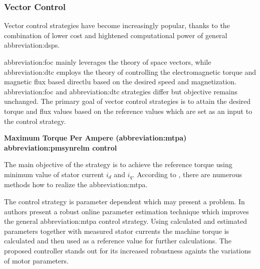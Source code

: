 \documentclass[a4paper, twoside, 11pt]{article}
\begin{document}
        \subsubsection{Vector Control}
            Vector control strategies have become increasingly popular, thanks to the combination of lower cost and hightened computational power of general \gls{abbreviation:dsp}s. \cite{dwivedi-review-on-control-strategies-of-permanent-magnet-assisted-synchronous-reluctance-motor-drive}
            \par
            \gls{abbreviation:foc} mainly leverages the theory of space vectors, while \gls{abbreviation:dtc} employs the theory of controlling the electromagnetic torque and magnetic flux based directlu based on the desired speed and magnetization. \gls{abbreviation:foc} and \gls{abbreviation:dtc} strategies differ but objective remains unchanged. The primary goal of vector control strategies is to attain the desired torque and flux values based on the reference values which are set as an input to the control strategy. \cite{heidari-a-review-of-synchronour-relucatence-motor-drive-advancements, dwivedi-review-on-control-strategies-of-permanent-magnet-assisted-synchronous-reluctance-motor-drive}
            
            \vspace*{0.45cm}
             \hspace*{-\parindent} \textbf{Maximum Torque Per Ampere (\gls{abbreviation:mtpa}) \gls{abbreviation:pmsynrelm} control}\par
                \hspace*{\parindent} The main objective of the strategy is to achieve the reference torque using minimum value of stator current $i_d$ and $i_q$. According to \cite{dwivedi-review-on-control-strategies-of-permanent-magnet-assisted-synchronous-reluctance-motor-drive}, there are numerous methods how to realize the \gls{abbreviation:mtpa}.\par
                The control strategy is parameter dependent which may present a problem. In \cite{niazi-robust-maximum-torque-per-ampere-control-of-pmsynrelm} authors present a robust online parameter estimation technique which improves the general \gls{abbreviation:mtpa} control strategy. Using calculated and estimated parameters together with measured stator currents the machine torque is calculated and then used as a reference value for further calculations. The proposed controller stands out for its increased robustness againts the variations of motor parameters.
            
\end{document}
